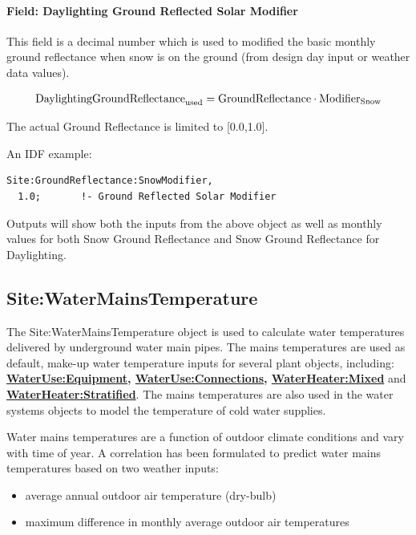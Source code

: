 \paragraph{Field: Daylighting Ground Reflected Solar Modifier}\label{field-daylighting-ground-reflected-solar-modifier}

This field is a decimal number which is used to modified the basic monthly ground reflectance when snow is on the ground (from design day input or weather data values).

\begin{equation}
\rm{DaylightingGroundReflectance}_{\rm{used}} = \rm{GroundReflectance} \cdot \rm{Modifier}_{\rm{Snow}}
\end{equation}

The actual Ground Reflectance is limited to {[}0.0,1.0{]}.

An IDF example:

\begin{lstlisting}
Site:GroundReflectance:SnowModifier,
  1.0;       !- Ground Reflected Solar Modifier
\end{lstlisting}

Outputs will show both the inputs from the above object as well as monthly values for both Snow Ground Reflectance and Snow Ground Reflectance for Daylighting.

\subsection{Site:WaterMainsTemperature}\label{sitewatermainstemperature}

The Site:WaterMainsTemperature object is used to calculate water temperatures delivered by underground water main pipes. The mains temperatures are used as default, make-up water temperature inputs for several plant objects, including: \textbf{\hyperref[wateruseequipment]{WaterUse:Equipment}, \hyperref[wateruseconnections]{WaterUse:Connections}, \hyperref[waterheatermixed]{WaterHeater:Mixed}} and \textbf{\hyperref[waterheaterstratified]{WaterHeater:Stratified}}. The mains temperatures are also used in the water systems objects to model the temperature of cold water supplies.

Water mains temperatures are a function of outdoor climate conditions and vary with time of year. A correlation has been formulated to predict water mains temperatures based on two weather inputs:

\begin{itemize}
\item
  average annual outdoor air temperature (dry-bulb)
\item
  maximum difference in monthly average outdoor air temperatures
\end{itemize}

